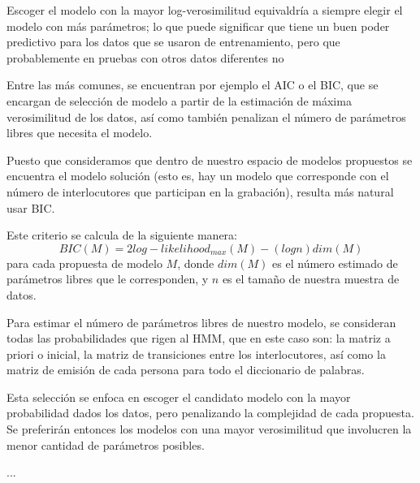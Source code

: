 Escoger el modelo con la mayor log-verosimilitud equivaldría a siempre elegir el modelo con más parámetros; lo que puede significar que tiene un buen poder predictivo para los datos que se usaron de entrenamiento, pero que probablemente en pruebas con otros datos diferentes no  

Entre las más comunes, se encuentran por ejemplo el \acf{AIC} o el \acf{BIC}, que se encargan de selección de modelo a partir de la estimación de máxima verosimilitud de los datos, así como también penalizan el número de parámetros libres que necesita el modelo.



Puesto que consideramos que dentro de nuestro espacio de modelos propuestos se encuentra el modelo solución (esto es, hay un modelo que corresponde con el número de interlocutores que participan en la grabación), resulta más natural usar \ac{BIC}.

Este criterio se calcula de la siguiente manera: 
\begin{equation}
BIC(M) = 2 log-likelihood_{max}(M) - (log n ) dim(M)
\end{equation}
para cada propuesta de modelo $M$, donde $dim(M)$ es el número estimado de parámetros libres que le corresponden, y $n$ es el tamaño de nuestra muestra de datos.

Para estimar el número de parámetros libres de nuestro modelo, se consideran todas las probabilidades que rigen al \ac{HMM}, que en este caso son: la matriz a priori o inicial, la matriz de transiciones entre los interlocutores, así como la matriz de emisión de cada persona para todo el diccionario de palabras.

Esta selección se enfoca en escoger el candidato modelo con la mayor probabilidad dados los datos, pero penalizando la complejidad de cada propuesta. Se preferirán entonces los modelos con una mayor verosimilitud que involucren la menor cantidad de parámetros posibles. 

...